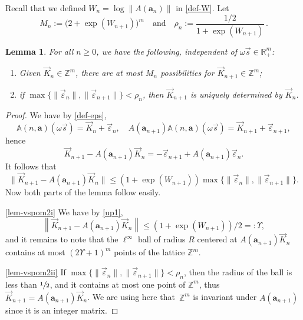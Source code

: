 \documentclass[10pt]{amsart}
\newenvironment{enumeratei}
{\bgroup\def\theenumi{\roman{enumi}}\def\theenumii{\arabic{enumii}}\begin{enumerate}}
{\end{enumerate}\egroup}
\newcommand\shalf{\sfrac{1}{2}}
\theoremstyle{plain}
\newtheorem{lemma}[theorem]{Lemma}
\theoremstyle{definition}
\newcommand\bom{{\boldsymbol a}}\let\ba\bom
\let\eps\varepsilon
\let\om\omega
\newcommand\Aa{\mathbb{A}}
\newcommand{\R}{\mathbb{R}}
\newcommand{\Z}{\mathbb{Z}}
\newcommand\be{\begin{equation}}
\newcommand\ee{\end{equation}}
\begin{document}
Recall that we defined $W_n = \log\|A(\bom_n)\|$ in \eqref{def-W}.
Let
\be \label{def-Mn}
M_n:= \bigl(2+\exp(W_{n+1})\bigr)^m\quad \text{and}\quad \rho_n:= \frac{1/2}{1+\exp(W_{n+1})}\,.
\ee

\begin{lemma} \label{lem-vspom2}
For all $n\ge 0$, we have the following, independent of $\om\vec s\in \R_+^m$:
\begin{enumeratei}
\item\label{lem-vspom2i}
Given $\vec{K}_{n}\in\Z^m$, there are at most $M_n$ possibilities for $\vec K_{n+1}\in\Z^m$;

\item\label{lem-vspom2ii}
if $\max\{\|\vec\eps_{n}\|,\|\vec\eps_{{n+1}}\| \}< \rho_n$, then $\vec K_{{n+1}}$ is uniquely determined by $\vec K_{n}$.
\end{enumeratei}
\end{lemma}

\begin{proof}
We have by \eqref{def-eps},
\[
\Aa(n,\bom) (\om\vec s) = \vec{K}_n + \vec{\eps}_n,\quad A(\bom_{n+1}) \Aa(n,\bom) (\om\vec s) = \vec{K}_{n+1} + \vec{\eps}_{n+1},
\]
hence
\[
\vec{K}_{n+1} - A(\bom_{n+1})\vec{K}_n = -\vec{\eps}_{n+1} + A(\bom_{n+1})\vec{\eps}_n.
\]
It follows that
\[
\bigl\|\vec{K}_{n+1} - A(\bom_{n+1})\vec{K}_n\bigr\| \le (1 + \exp (W_{n+1}))\max\{\|\vec\eps_{n}\|,\|\vec\eps_{{n+1}}\|\}.
\]
Now both parts of the lemma follow easily.

\eqref{lem-vspom2i} We have by \eqref{up1},
\[
\left\|\vec{K}_{n+1} - A(\bom_{n+1})\vec{K}_n\right\| \le (1 + \exp (W_{n+1}))/2=:\Upsilon,
\]
and it remains to note that the $\ell^\infty$ ball of radius $R$ centered at $A(\bom_{n+1})\vec{K}_n$ contains at most $(2\Upsilon+1)^m$ points of the lattice $\Z^m$.

\eqref{lem-vspom2ii} If $\max\{\|\vec\eps_{n}\|,\|\vec\eps_{{n+1}}\|\}< \rho_n$, then the radius of the ball is less than $\shalf$, and it contains at most one point of $\Z^m$, thus $\vec{K}_{n+1} = A(\bom_{n+1})\vec{K}_n$. We are using here that~$\Z^m$ is invariant under $A(\bom_{n+1})$ since it is an integer matrix.
\end{proof}
\end{document}
